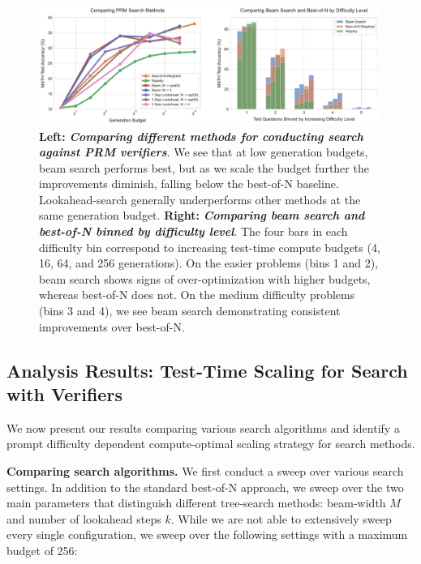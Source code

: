 \begin{figure}
    \centering
    \includegraphics[width=0.99\textwidth]{figures/search_comparing_and_bins3.pdf}
    \vspace{-0.25cm}
    \caption{\footnotesize{\textbf{Left:} \textbf{\emph{Comparing different methods for conducting search against PRM verifiers}}. We see that at low generation budgets, beam search performs best, but as we scale the budget further the improvements diminish, falling below the best-of-N baseline. Lookahead-search generally underperforms other methods at the same generation budget. \textbf{Right:} \textbf{\emph{Comparing beam search and best-of-N binned by difficulty level}}. The four bars in each difficulty bin correspond to increasing test-time compute budgets (4, 16, 64, and 256 generations). On the easier problems (bins 1 and 2), beam search shows signs of over-optimization with higher budgets, whereas best-of-N does not. On the medium difficulty problems (bins 3 and 4), we see beam search demonstrating consistent improvements over best-of-N.}}
    \label{fig:comparing_search_and_beam_difficulty}
    \vspace{-0.2cm}
\end{figure}

\vspace{-0.2cm}
\subsection{Analysis Results: Test-Time Scaling for Search with Verifiers}
\vspace{-0.2cm}
We now present our results comparing various search algorithms and identify a prompt difficulty dependent compute-optimal scaling strategy for search methods.

\textbf{Comparing search algorithms.} We first conduct a sweep over various search settings. In addition to the standard best-of-N approach, we sweep over the two main parameters that distinguish different tree-search methods: beam-width $M$ and number of lookahead steps $k$. While we are not able to extensively sweep every single configuration, we sweep over the following settings with a maximum budget of 256:

